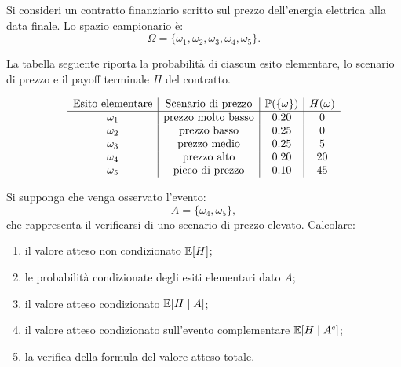 \begin{exercise}
\label{ex:cap3-payoff-elettrico-condizionato}
\par\smallskip

Si consideri un contratto finanziario scritto sul prezzo dell'energia elettrica
alla data finale. Lo spazio campionario \`{e}:
\[
\Omega
=
\{\omega_1,\omega_2,\omega_3,\omega_4,\omega_5\}.
\]

La tabella seguente riporta la probabilit\`{a} di ciascun esito elementare,
lo scenario di prezzo e il payoff terminale $H$ del contratto.

\[
\begin{array}{c|c|c|c}
\text{Esito elementare} & \text{Scenario di prezzo} &
\mathbb{P}(\{\omega\}) & H(\omega) \\
\hline
\omega_1 & \text{prezzo molto basso} & 0.20 & 0 \\
\omega_2 & \text{prezzo basso}       & 0.25 & 0 \\
\omega_3 & \text{prezzo medio}       & 0.25 & 5 \\
\omega_4 & \text{prezzo alto}        & 0.20 & 20 \\
\omega_5 & \text{picco di prezzo}    & 0.10 & 45 \\
\end{array}
\]

Si supponga che venga osservato l'evento:
\[
A=\{\omega_4,\omega_5\},
\]
che rappresenta il verificarsi di uno scenario di prezzo elevato. Calcolare:

\begin{enumerate}
    \item il valore atteso non condizionato $\mathbb{E}[H]$;

    \item le probabilit\`{a} condizionate degli esiti elementari dato $A$;

    \item il valore atteso condizionato $\mathbb{E}[H\mid A]$;

    \item il valore atteso condizionato sull'evento complementare
    $\mathbb{E}[H\mid A^c]$;

    \item la verifica della formula del valore atteso totale.
\end{enumerate}

\medskip

\end{exercise}

